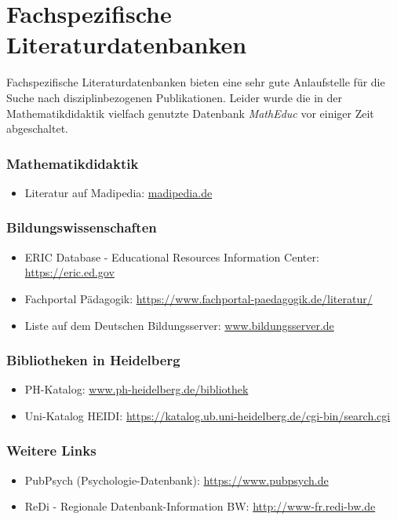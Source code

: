 \documentclass{../cssheet}
\begin{document}
\section{Fachspezifische Literaturdatenbanken}

Fachspezifische Literaturdatenbanken bieten eine sehr gute Anlaufstelle für die Suche nach disziplinbezogenen Publikationen. Leider wurde die in der Mathematikdidaktik vielfach genutzte Datenbank \emph{MathEduc} vor einiger Zeit abgeschaltet.

\subsubsection*{Mathematikdidaktik}
\begin{itemize}
\item Literatur auf Madipedia: \href{https://madipedia.de/wiki/Mathematikdidaktische_Literatur}{madipedia.de}
\end{itemize}

\subsubsection*{Bildungswissenschaften}
\begin{itemize}
\item ERIC Database - Educational Resources Information Center: \url{https://eric.ed.gov}
\item Fachportal Pädagogik: \url{https://www.fachportal-paedagogik.de/literatur/}
\item Liste auf dem Deutschen Bildungsserver: \href{https://www.bildungsserver.de/Erziehungswissenschaftliche-Literaturdatenbanken-994-de.html}{www.bildungsserver.de}
\end{itemize}

\subsubsection*{Bibliotheken in Heidelberg}
\begin{itemize}
\item PH-Katalog: \href{https://www.ph-heidelberg.de/bibliothek/mediensuche/rechercheangebote/katalog-ph.html}{www.ph-heidelberg.de/bibliothek}
\item Uni-Katalog HEIDI: \url{https://katalog.ub.uni-heidelberg.de/cgi-bin/search.cgi}
\end{itemize}
\subsubsection*{Weitere Links}
\begin{itemize}
\item PubPsych (Psychologie-Datenbank): \url{https://www.pubpsych.de}
\item ReDi - Regionale Datenbank-Information BW: \url{http://www-fr.redi-bw.de}
\end{itemize}
\end{document}
